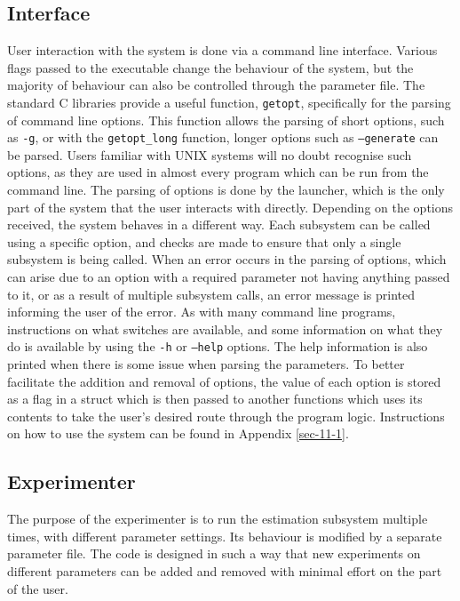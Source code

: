 \documentclass[a4paper,11pt]{article}
\begin{document}
\subsection{Interface}
\label{sec-3-5}

   User interaction with the system is done via a command line
   interface. Various flags passed to the executable change the behaviour of the
   system, but the majority of behaviour can also be controlled through the
   parameter file. The standard C libraries provide a useful function,
   \texttt{getopt}, specifically for the parsing of command line options. This
   function allows the parsing of short options, such as \texttt{-g}, or with
   the \texttt{getopt\_long} function, longer options such as
   \texttt{--generate} can be parsed. Users familiar with UNIX systems will no
   doubt recognise such options, as they are used in almost every program which
   can be run from the command line. The parsing of options is done by the
   launcher, which is the only part of the system that the user interacts with
   directly. Depending on the options received, the system behaves in a
   different way. Each subsystem can be called using a specific option, and
   checks are made to ensure that only a single subsystem is being called. When
   an error occurs in the parsing of options, which can arise due to an option
   with a required parameter not having anything passed to it, or as a result of
   multiple subsystem calls, an error message is printed informing the user of
   the error. As with many command line programs, instructions on what switches
   are available, and some information on what they do is available by using the
   \texttt{-h} or \texttt{--help} options. The help information is also printed
   when there is some issue when parsing the parameters. To better facilitate
   the addition and removal of options, the value of each option is stored as a
   flag in a struct which is then passed to another functions which uses its
   contents to take the user's desired route through the program
   logic. Instructions on how to use the system can be found in Appendix \ref{sec-11-1}.
\subsection{Experimenter}
\label{sec-3-6}

   The purpose of the experimenter is to run the estimation subsystem multiple
   times, with different parameter settings. Its behaviour is modified by a
   separate parameter file. The code is designed in such a way that new
   experiments on different parameters can be added and removed with minimal
   effort on the part of the user. 
\end{document}
